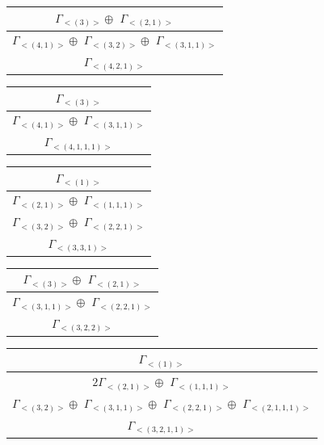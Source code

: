 \bigskip
\begin{minipage}{.4\textwidth}
\centering
\begin{tabular}{|c|}\hline
$\Gamma_{<(
3
)>} \oplus$
$\Gamma_{<(
2 , 
1
)>}$
\\ \hline
$\Gamma_{<(
4 , 
1
)>} \oplus$
$\Gamma_{<(
3 , 
2
)>} \oplus$
$\Gamma_{<(
3 , 
1 , 
1
)>}$
\\ \hline
$\Gamma_{<(
4 , 
2 , 
1
)>}$
\\
\hline\end{tabular}\end{minipage}
\begin{minipage}{.3\textwidth}
\centering
\begin{tabular}{|c|}\hline
$\Gamma_{<(
3
)>}$
\\ \hline
$\Gamma_{<(
4 , 
1
)>} \oplus$
$\Gamma_{<(
3 , 
1 , 
1
)>}$
\\ \hline
$\Gamma_{<(
4 , 
1 , 
1 , 
1
)>}$
\\
\hline\end{tabular}\end{minipage}
\begin{minipage}{.3\textwidth}
\centering
\begin{tabular}{|c|}\hline
$\Gamma_{<(
1
)>}$
\\ \hline
$\Gamma_{<(
2 , 
1
)>} \oplus$
$\Gamma_{<(
1 , 
1 , 
1
)>}$
\\ \hline
$\Gamma_{<(
3 , 
2
)>} \oplus$
$\Gamma_{<(
2 , 
2 , 
1
)>}$
\\ \hline
$\Gamma_{<(
3 , 
3 , 
1
)>}$
\\
\hline\end{tabular}\end{minipage}
\bigskip
\begin{minipage}{.25\textwidth}
\centering
\begin{tabular}{|c|}\hline
$\Gamma_{<(
3
)>} \oplus$
$\Gamma_{<(
2 , 
1
)>}$
\\ \hline
$\Gamma_{<(
3 , 
1 , 
1
)>} \oplus$
$\Gamma_{<(
2 , 
2 , 
1
)>}$
\\ \hline
$\Gamma_{<(
3 , 
2 , 
2
)>}$
\\
\hline\end{tabular}\end{minipage}
\begin{minipage}{.6\textwidth}
\centering
\begin{tabular}{|c|}\hline
$\Gamma_{<(
1
)>}$
\\ \hline
$ 2 \Gamma_{<(
2 , 
1
)>} \oplus$
$\Gamma_{<(
1 , 
1 , 
1
)>}$
\\ \hline
$\Gamma_{<(
3 , 
2
)>} \oplus$
$\Gamma_{<(
3 , 
1 , 
1
)>} \oplus$
$\Gamma_{<(
2 , 
2 , 
1
)>} \oplus$
$\Gamma_{<(
2 , 
1 , 
1 , 
1
)>}$
\\ \hline
$\Gamma_{<(
3 , 
2 , 
1 , 
1
)>}$
\\
\hline\end{tabular}\end{minipage}
